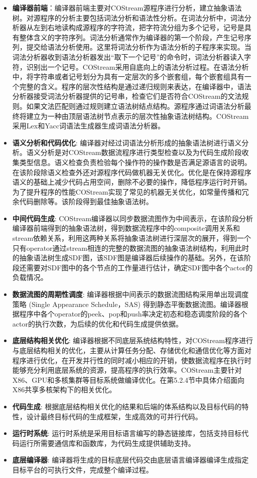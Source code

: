 \begin{itemize}	
  \item {\bf 编译器前端}：编译器前端主要对COStream源程序进行分析，建立抽象语法树。对源程序的分析主要包括词法分析和语法性分析。在词法分析中，词法分析器从左到右地读构成源程序的字符流，把字符流分组为多个记号，记号是具有整体含义的字符序列。词法分析通常作为编译器的第一个阶段，产生记号序列，提交给语法分析使用。这里将词法分析作为语法分析的子程序来实现。当词法分析器收到语法分析器发出“取下一个记号”的命令时，词法分析器读入字符，识别出一个记号。COStream采用自底向上的语法分析过程。在语法分析中，将字符串或者记号划分为具有一定层次的多个嵌套组，每个嵌套组具有一个完整的含义。程序的层次性结构是通过递归规则来表达，在编译器中，语法分析器接受词法分析器提供的记号串，检查它们是否符合COStream的文法规则。如果文法匹配则通过规则建立语法树结点结构。源程序通过词语法分析最终将建立为一种由顶层语法树节点表示的层次性抽象语法树结构。COStream采用Lex和Yacc词语法生成器生成词语法分析器。

  \item {\bf 语义分析和代码优化}: 编译器对经过词语法分析形成的抽象语法树进行语义分析。语义分析是对COStream数据流程序进行类型检查以及为代码生成阶段收集类型信息。语义检查负责检验每个操作符的操作数是否满足源语言的说明。在该阶段除语义检查外还对源程序代码做机器无关优化。优化是在保持源程序语义的基础上减少代码占用空间，删除不必要的操作，降低程序运行时开销。为了提升程序的性能COStream实现了常见的机器无关优化，如常量传播和冗余代码删除等。该阶段得到最佳抽象语法树。
  \item {\bf 中间代码生成}: COStream编译器以同步数据流图作为中间表示，在该阶段分析编译器前端得到的抽象语法树，得到数据流程序中的composite调用关系和stream依赖关系，利用这两种关系将抽象语法树进行深层次的展开，得到一个只有operator通过stream相连的完整的数据流图的抽象语法树结构，利用此时的抽象语法树生成SDF图，该SDF图是编译器后续操作的基础。另外，在该阶段还需要对SDF图中的各个节点的工作量进行估计，确定SDF图中各个actor的负载情况。
  \item {\bf 数据流图的周期性调度}: 编译器根据中间表示的数据流图结构采用单出现调度策略 (Single Appearance Schedule，SAS) 得到静态平衡数据流图。编译器根据程序中各个operator的peek、pop和push率决定初态和稳态调度阶段的各个actor的执行次数，为后续的优化和代码生成提供依据。
  \item {\bf 底层结构相关优化}: 编译器根据不同底层系统结构特性，对COStream程序进行与底层结构相关的优化，主要从计算任务分配、存储优化和通信优化等方面对程序进行优化，在开发并行性的同时减小相应的开销，使数据流程序在执行时能够充分利用底层系统的资源，提高程序的执行效率。COStream主要针对X86、GPU和多核集群等目标系统做编译优化。在第5.2.4节中具体介绍面向X86共享多核架构下的相关优化。
  \item {\bf 代码生成}: 根据底层结构相关优化的结果和后端的体系结构以及目标代码的特性，设计最终目标代码的生成框架，生成高效的可并行代码。
  \item {\bf 运行时系统}: 运行时系统是采用目标语言编写的静态链接库，包括支持目标代码运行所需要通信库和函数库，为代码生成提供辅助支持。
  \item {\bf 底层编译器}: 编译器将生成的目标底层代码交由底层语言编译器编译生成指定目标平台的可执行文件，完成整个编译过程。
  
\end{itemize}

